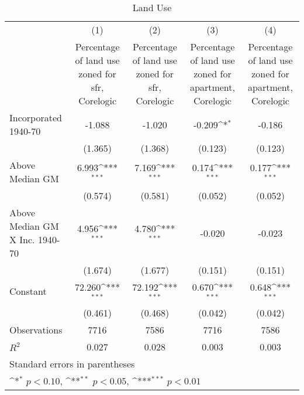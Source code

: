 \begin{table}[htbp]\centering
\def\sym#1{\ifmmode^{#1}\else\(^{#1}\)\fi}
\caption{Land Use}
\begin{tabular}{l*{4}{c}}
\hline\hline
                    &\multicolumn{1}{c}{(1)}&\multicolumn{1}{c}{(2)}&\multicolumn{1}{c}{(3)}&\multicolumn{1}{c}{(4)}\\
                    &\multicolumn{1}{c}{Percentage of land use zoned for sfr, Corelogic}&\multicolumn{1}{c}{Percentage of land use zoned for sfr, Corelogic}&\multicolumn{1}{c}{Percentage of land use zoned for apartment, Corelogic}&\multicolumn{1}{c}{Percentage of land use zoned for apartment, Corelogic}\\
\hline
Incorporated 1940-70&      -1.088         &      -1.020         &      -0.209\sym{*}  &      -0.186         \\
                    &     (1.365)         &     (1.368)         &     (0.123)         &     (0.123)         \\
[1em]
Above Median GM     &       6.993\sym{***}&       7.169\sym{***}&       0.174\sym{***}&       0.177\sym{***}\\
                    &     (0.574)         &     (0.581)         &     (0.052)         &     (0.052)         \\
[1em]
Above Median GM X Inc. 1940-70&       4.956\sym{***}&       4.780\sym{***}&      -0.020         &      -0.023         \\
                    &     (1.674)         &     (1.677)         &     (0.151)         &     (0.151)         \\
[1em]
Constant            &      72.260\sym{***}&      72.192\sym{***}&       0.670\sym{***}&       0.648\sym{***}\\
                    &     (0.461)         &     (0.468)         &     (0.042)         &     (0.042)         \\
\hline
Observations        &        7716         &        7586         &        7716         &        7586         \\
\(R^{2}\)           &       0.027         &       0.028         &       0.003         &       0.003         \\
\hline\hline
\multicolumn{5}{l}{\footnotesize Standard errors in parentheses}\\
\multicolumn{5}{l}{\footnotesize \sym{*} \(p<0.10\), \sym{**} \(p<0.05\), \sym{***} \(p<0.01\)}\\
\end{tabular}
\end{table}

